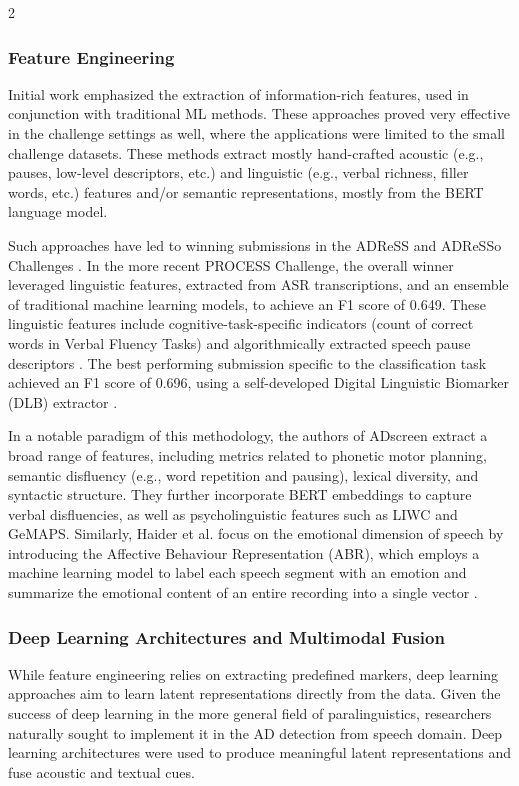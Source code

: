 \documentclass[10pt]{article}
\begin{document}
\begin{multicols}{2}
\subsubsection{Feature Engineering} \par Initial work emphasized the extraction
of information-rich features, used in conjunction with traditional ML methods.
These approaches proved very effective in the challenge settings as well, where
the applications were limited to the small challenge datasets. These methods
extract mostly hand-crafted acoustic (e.g., pauses, low-level descriptors,
etc.) and linguistic (e.g., verbal richness, filler words, etc.) features
and/or semantic representations, mostly from the BERT
\cite{devlinBERTPretrainingDeep2019} language model. \par Such approaches have
led to winning submissions in the ADReSS and ADReSSo Challenges
\cite{haulcyClassifyingAlzheimersDisease2021,
syedTacklingADRESSOChallenge2021}. In the more recent PROCESS Challenge, the
overall winner leveraged linguistic features, extracted from ASR
transcriptions, and an ensemble of traditional machine learning models, to
achieve an F1 score of 0.649. These linguistic features include
cognitive-task-specific indicators (count of correct words in Verbal Fluency
Tasks) and algorithmically extracted speech pause descriptors
\cite{gaoLeveragingMultimodalMethods2025}. The best performing submission
specific to the classification task achieved an F1 score of 0.696, using a
self-developed Digital Linguistic Biomarker (DLB) extractor
\cite{zhangCognitiveDeclineDetection2025}. \par In a notable paradigm of this
methodology, the authors of ADscreen
\cite{zolnooriADscreenSpeechProcessingbased2023} extract a broad range of
features, including metrics related to phonetic motor planning, semantic
disfluency (e.g., word repetition and pausing), lexical diversity, and
syntactic structure. They further incorporate BERT embeddings to capture verbal
disfluencies, as well as psycholinguistic features such as LIWC and GeMAPS.
Similarly, Haider et al. focus on the emotional dimension of speech by
introducing the Affective Behaviour Representation (ABR), which employs a
machine learning model to label each speech segment with an emotion and
summarize the emotional content of an entire recording into a single vector
\cite{haiderAffectiveSpeechAlzheimers2020}.

\subsubsection{Deep Learning Architectures and Multimodal Fusion} \par While
feature engineering relies on extracting predefined markers, deep learning
approaches aim to learn latent representations directly from the data. Given
the success of deep learning in the more general field of paralinguistics,
researchers naturally sought to implement it in the AD detection from speech
domain. Deep learning architectures were used to produce meaningful latent
representations and fuse acoustic and textual cues.




\end{multicols}
\end{document}
